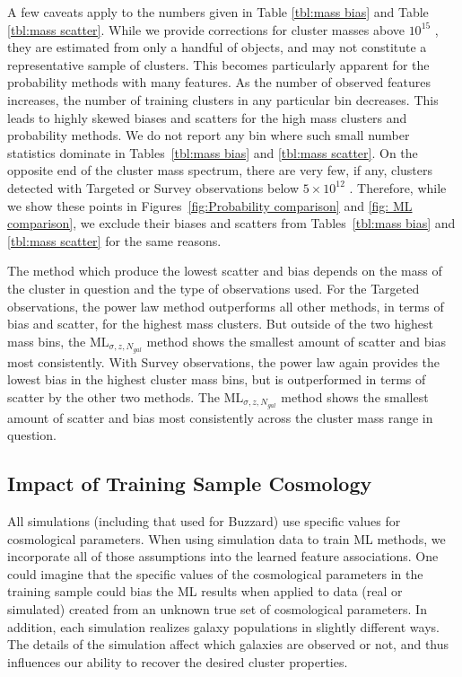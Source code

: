 \documentclass[fleqn,usenatbib]{mnras}
\begin{document}
A few caveats apply to the numbers given in Table \ref{tbl:mass bias} and Table \ref{tbl:mass scatter}. While we provide corrections for cluster masses above $10^{15}$ \msol, they are estimated from only a handful of objects, and may not constitute a representative sample of clusters. This becomes particularly apparent for the probability methods with many features. As the number of observed features increases, the number of training clusters in any particular bin decreases. This leads to highly skewed biases and scatters for the high mass clusters and probability methods. We do not report any bin where such small number statistics dominate in Tables~\ref{tbl:mass bias} and \ref{tbl:mass scatter}. On the opposite end of the cluster mass spectrum, there are very few, if any, clusters detected with Targeted or Survey observations below $5\times10^{12}$ \msol. Therefore, while we show these points in Figures~\ref{fig:Probability comparison} and \ref{fig: ML comparison}, we exclude their biases and scatters from Tables~\ref{tbl:mass bias} and \ref{tbl:mass scatter} for the same reasons. 
 
The method which produce the lowest scatter and bias depends on the mass of the cluster in question and the type of observations used. For the Targeted observations, the power law method outperforms all other methods, in terms of bias and scatter, for the highest mass clusters. But outside of the two highest mass bins, the $\mathrm{ML}_{\sigma, z, N_{gal}}$ method shows the smallest amount of scatter and bias most consistently. With Survey observations, the power law again provides the lowest bias in the highest cluster mass bins, but is outperformed in terms of scatter by the other two methods. The $\mathrm{ML}_{\sigma, z, N_{gal}}$ method shows the smallest amount of scatter and bias most consistently across the cluster mass range in question.
 
\subsection{Impact of Training Sample Cosmology}
All simulations (including that used for Buzzard) use specific values for cosmological parameters. When using simulation data to train ML methods, we incorporate all of those assumptions into the learned feature associations. One could imagine that the specific values of the cosmological parameters in the training sample could bias the ML results when applied to data (real or simulated) created from an unknown true set of cosmological parameters. In addition, each simulation realizes galaxy populations in slightly different ways. The details of the simulation affect which galaxies are observed or not, and thus influences our ability to recover the desired cluster properties. 
\end{document}
